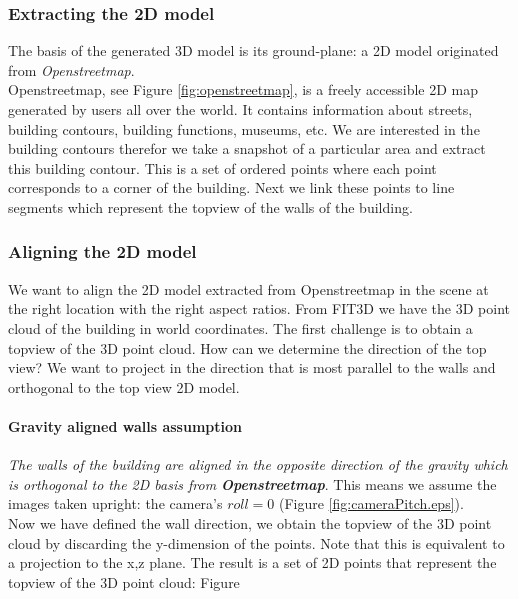 \subsubsection{Extracting the 2D model}
The basis of the generated 3D model is its ground-plane: a 2D model originated from
\emph{Openstreetmap}.\\
Openstreetmap, see Figure \ref{fig:openstreetmap}, is a freely accessible 2D map generated by
users all over the world. It contains information about streets, building
contours, building functions, museums, etc.  We are interested in the building
contours therefor we take a snapshot of a particular area and extract this building
contour.  This is a set of ordered points where each point corresponds to a
corner of the building.  Next we link these points to line segments which
represent the topview of the walls of the building.

\subsubsection{Aligning the 2D model}
We want to align the 2D model extracted from Openstreetmap in the scene at the right location with the right aspect ratios. 
From FIT3D we have the 3D point cloud of the building in world coordinates.
The first challenge is to obtain a topview of the 3D point cloud.
How can we determine the direction of the top view? We want to project in the
direction that is most parallel to the walls and orthogonal to the top view 2D model.

\paragraph{Gravity aligned walls assumption}
	\emph{The walls of the building are aligned in the opposite direction of the gravity
	which is orthogonal to the 2D basis from \textbf{Openstreetmap}}. This means
	we assume the images taken upright: the camera's $roll=0$ (Figure
	\ref{fig:cameraPitch.eps}).\\

Now we have defined the wall direction, we obtain the topview of the 3D point
cloud by discarding the y-dimension of the points.  Note that this is equivalent to a
projection to the x,z plane. The result is a set of 2D points that represent the
topview of the 3D point cloud: Figure %

